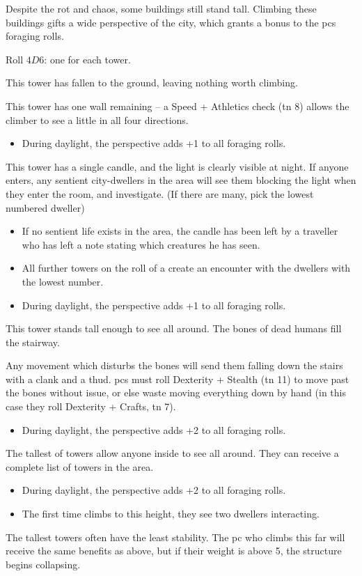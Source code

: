 \begin{multicols}{2}
Despite the rot and chaos, some buildings still stand tall.
Climbing these buildings gifts a wide perspective of the city, which grants a bonus to the \glspl{pc} foraging rolls.

Roll $4D6$: one for each tower.

\begin{dlist}
  \item
  This tower has fallen to the ground, leaving nothing worth climbing.
  \item
  This tower has one wall remaining -- a Speed + Athletics check (\gls{tn} 8) allows the climber to see a little in all four directions.
  \begin{itemize}
    \item
    During daylight, the perspective adds +1 to all foraging rolls.
  \end{itemize}
  \item
  This tower has a single candle, and the light is clearly visible at night.
  If anyone enters, any sentient city-dwellers in the area will see them blocking the light when they enter the room, and investigate.
  (If there are many, pick the lowest numbered dweller)
  \begin{itemize}
    \item
    If no sentient life exists in the area, the candle has been left by a traveller who has left a note stating which creatures he has seen.
    \item
    All further towers on the roll of a  create an encounter with the dwellers with the lowest number.
    \item
    During daylight, the perspective adds +1 to all foraging rolls.
  \end{itemize}
  \item
  This tower stands tall enough to see all around.
  The bones of dead humans fill the stairway.

  Any movement which disturbs the bones will send them falling down the stairs with a clank and a thud.
  \Glspl{pc} must roll Dexterity + Stealth (\gls{tn} 11) to move past the bones without issue, or else waste  moving everything down by hand (in this case they roll Dexterity + Crafts, \gls{tn} 7).
  \begin{itemize}
    \item
    During daylight, the perspective adds +2 to all foraging rolls.
  \end{itemize}
  \item
  The tallest of towers allow anyone inside to see all around.
  They can receive a complete list of towers in the area.
  \begin{itemize}
    \item
    During daylight, the perspective adds +2 to all foraging rolls.
    \item
    The first time  climbs to this height, they see two dwellers interacting.
  \end{itemize}
  \item
  The tallest towers often have the least stability.
  The \gls{pc} who climbs this far will receive the same benefits as above, but if their \gls{weight} is above 5, the structure begins collapsing.


\end{dlist}
\end{multicols}
